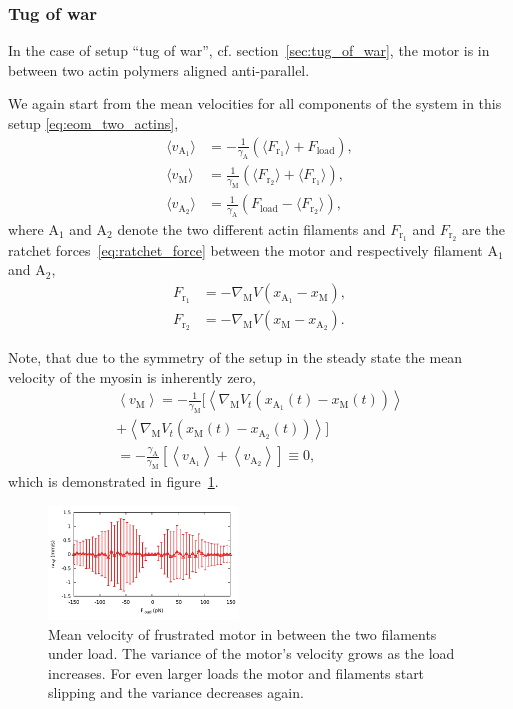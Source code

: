 \documentclass[aps,pre,twocolumn,showpacs,showkeys,superscriptaddress,floatfix]{revtex4-1}
\begin{document}
\subsubsection{Tug of war}
In the case of setup ``tug of war'', cf. section~\ref{sec:tug_of_war}, the motor is in between two actin polymers aligned anti-parallel. 

We again start from the mean velocities for all components of the system in this setup \eqref{eq:eom_two_actins},
\begin{align*}
\langle v_{\text{A}_1} \rangle &= - \frac{1}{\gamma_\text{A} } \left( \langle F_{\text{r}_1} \rangle + F_\text{load} \right) , \\
\langle v_\text{M} \rangle &= \frac{1}{\gamma_\text{M} } \left( \langle F_{\text{r}_2} \rangle + \langle F_{\text{r}_1} \rangle \right) , \\
\langle v_{\text{A}_2} \rangle &= \frac{1}{ \gamma_\text{A} } \left( F_\text{load} - \langle F_{\text{r}_2} \rangle \right) ,
\end{align*}
where ${\text{A}_1}$ and ${\text{A}_2}$ denote the two different actin filaments 
and $F_{\text{r}_1}$ and $F_{\text{r}_2}$ are the ratchet forces~\eqref{eq:ratchet_force} between the motor and respectively filament ${\text{A}_1}$ and ${\text{A}_2}$,
\begin{align*}
F_{\text{r}_1} &= - \nabla_\text{M} V( x_{\text{A}_1} - x_\text{M} ) , 
\\
F_{\text{r}_2} &= - \nabla_\text{M} V( x_\text{M} - x_{\text{A}_2} ) .
\end{align*} 

Note, that due to the symmetry of the setup in the steady state the mean velocity of the myosin is inherently zero,
\begin{multline*}
\left\langle v_\text{M} \right\rangle 
= - \frac{1}{\gamma_\text{M}} \bigl[ 
\left\langle \nabla_\text{M} V_t( x_{\text{A}_1}(t) - x_\text{M}(t) ) \right\rangle
\\ 
+ \left\langle \nabla_\text{M} V_t( x_\text{M}(t) - x_{\text{A}_2}(t) ) \right\rangle 
\bigr] 
\\
= - \frac{\gamma_\text{A}}{\gamma_\text{M}} \left[ 
\left\langle v_{\text{A}_1} \right\rangle 
+ \left\langle v_{\text{A}_2} \right\rangle 
\right]
\equiv 0 , 
\end{multline*}
which is demonstrated in figure~\ref{fig:tug_F_motor}.
\begin{figure}[t]
\centering
\includegraphics[width=0.45\textwidth,height=!]{tug_F_motor}
\caption{\label{fig:tug_F_motor}
Mean velocity of frustrated motor in between the two filaments under load. 
The variance of the motor's velocity grows as the load increases. 
For even larger loads the motor and filaments start slipping and the variance decreases again.
}
\end{figure}
\end{document}
